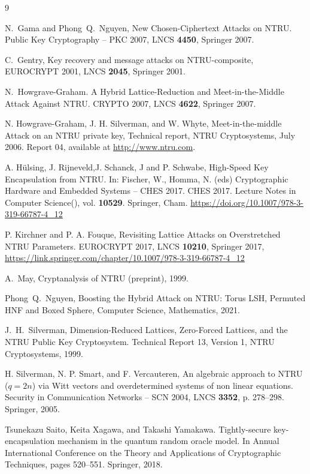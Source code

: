 \documentclass{amsart}
\numberwithin{equation}{section}
\begin{document}
\begin{thebibliography}{9}
 
 N.~Gama and Phong~Q.~Nguyen, New Chosen-Ciphertext Attacks on NTRU. Public Key Cryptography – PKC 2007, LNCS {\bf 4450}, Springer 2007.

 C.~Gentry, Key recovery and message attacks on NTRU-composite, EUROCRYPT 2001, LNCS {\bf 2045}, Springer 2001.

 N.~Howgrave-Graham. A Hybrid Lattice-Reduction and Meet-in-the-Middle Attack Against NTRU. CRYPTO 2007, LNCS {\bf 4622}, Springer 2007. 

 N. Howgrave-Graham, J. H. Silverman, and W. Whyte, Meet-in-the-middle Attack on an NTRU private key, Technical report, NTRU Cryptosystems, July 2006. Report  04, available at \url{http://www.ntru.com}.


 
 A. Hülsing, J. Rijneveld,J. Schanck, J and P. Schwabe, High-Speed Key Encapsulation from NTRU. In: Fischer, W., Homma, N. (eds) 
Cryptographic Hardware and Embedded Systems – CHES 2017. CHES 2017. Lecture 
Notes in Computer Science(), vol. {\bf 10529}. Springer, Cham. \url{https://doi.org/10.1007/978-3-319-66787-4\_12}



 P. Kirchner and P. A. Fouque, Revisiting Lattice Attacks on Overstretched NTRU Parameters. EUROCRYPT 2017, LNCS {\bf 10210}, Springer 2017, \url{https://link.springer.com/chapter/10.1007/978-3-319-66787-4_12}


  A.~May, Cryptanalysis of NTRU (preprint), 1999.

  Phong~Q.~Nguyen, Boosting the Hybrid Attack on NTRU: Torus LSH, Permuted HNF and Boxed Sphere, Computer Science, Mathematics, 2021.

 J.~H.~Silverman, Dimension-Reduced Lattices, Zero-Forced Lattices, and the NTRU Public Key Cryptosystem. Technical Report 13, Version 1, NTRU Cryptosystems, 1999.

 H. Silverman, N. P. Smart, and F. Vercauteren, An algebraic approach to NTRU ($q = 2n$) via Witt vectors and overdetermined systems of non linear equations. Security in Communication Networks -- SCN 2004, LNCS {\bf 3352}, p. 278--298. Springer, 2005.


 Tsunekazu Saito, Keita Xagawa, and Takashi Yamakawa. Tightly-secure key-encapsulation mechanism in the quantum random oracle model. In Annual International Conference on the Theory and Applications of Cryptographic Techniques, pages 520--551. Springer, 2018.

	\end{thebibliography}
\end{document}
